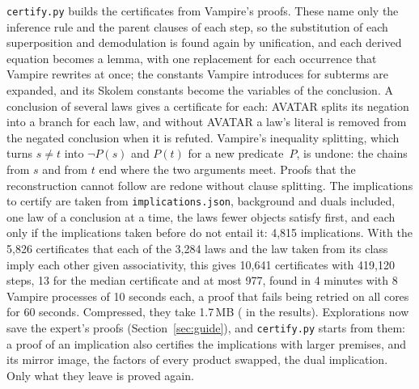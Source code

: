 \documentclass[11pt,a4paper]{article}
\theoremstyle{definition}
\theoremstyle{remark}
\newcommand{\code}[1]{\texttt{#1}}
\begin{document}
\code{certify.py} builds the certificates from Vampire's proofs. These name only the inference rule and the parent clauses of each step, so the substitution of each superposition and demodulation is found again by unification, and each derived equation becomes a lemma, with one replacement for each occurrence that Vampire rewrites at once; the constants Vampire introduces for subterms are expanded, and its Skolem constants become the variables of the conclusion. A conclusion of several laws gives a certificate for each: AVATAR splits its negation into a branch for each law, and without AVATAR a law's literal is removed from the negated conclusion when it is refuted. Vampire's inequality splitting, which turns $s \neq t$ into $\neg P(s)$ and $P(t)$ for a new predicate~$P$, is undone: the chains from $s$ and from $t$ end where the two arguments meet. Proofs that the reconstruction cannot follow are redone without clause splitting. The implications to certify are taken from \code{implications.json}, background and duals included, one law of a conclusion at a time, the laws fewer objects satisfy first, and each only if the implications taken before do not entail it: 4,815 implications. With the 5,826 certificates that each of the 3,284 laws and the law taken from its class imply each other given associativity, this gives 10,641 certificates with 419,120 steps, 13 for the median certificate and at most 977, found in 4 minutes with 8 Vampire processes of 10 seconds each, a proof that fails being retried on all cores for 60 seconds. Compressed, they take 1.7\,MB ( in the results). Explorations now save the expert's proofs (Section~\ref{sec:guide}), and \code{certify.py} starts from them: a proof of an implication also certifies the implications with larger premises, and its mirror image, the factors of every product swapped, the dual implication. Only what they leave is proved again.
\end{document}
